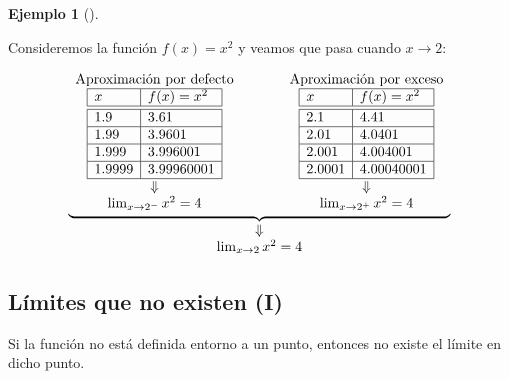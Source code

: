\documentclass[
  a4paper,
]{scrreport}
\theoremstyle{plain}
\theoremstyle{plain}
\theoremstyle{definition}
\theoremstyle{definition}
\newtheorem{example}{Ejemplo}[chapter]
\theoremstyle{plain}
\theoremstyle{remark}
\begin{document}
\leavevmode{}%
\begin{example}[]\label{exm-limites-aproximados}

Consideremos la función \(f(x)=x^2\) y veamos que pasa cuando
\(x\to 2\):

\[
\begin{array}{c}
\underbrace{\begin{array}{ccc}
\textrm{Aproximación por defecto} & \qquad & \textrm{Aproximación por exceso}\\
\begin{array}{|l|l|}
\hline
x       & f(x)=x^2   \\
\hline\hline
 1.9    & 3.61       \\
\hline
 1.99   & 3.9601     \\
\hline
 1.999  & 3.996001   \\
\hline
 1.9999 & 3.99960001 \\
\hline
\end{array}
& &
\begin{array}{|l|l|}
\hline
x       & f(x)=x^2   \\
\hline\hline
 2.1    & 4.41       \\
\hline
 2.01   & 4.0401    \\
\hline
 2.001  & 4.004001   \\
\hline
 2.0001 & 4.00040001 \\
\hline
\end{array}\\
\Downarrow & & \Downarrow\\
\lim_{x\to 2^-}x^2=4
& &
\lim_{x\to 2^+}x^2=4
\end{array}}\\
\Downarrow\\
\lim_{x\to 2}x^2=4
\end{array}
\]

\end{example}

\hypertarget{luxedmites-que-no-existen-i}{%
\subsection{Límites que no existen
(I)}\label{luxedmites-que-no-existen-i}}

Si la función no está definida entorno a un punto, entonces no existe el
límite en dicho punto.
\end{document}
